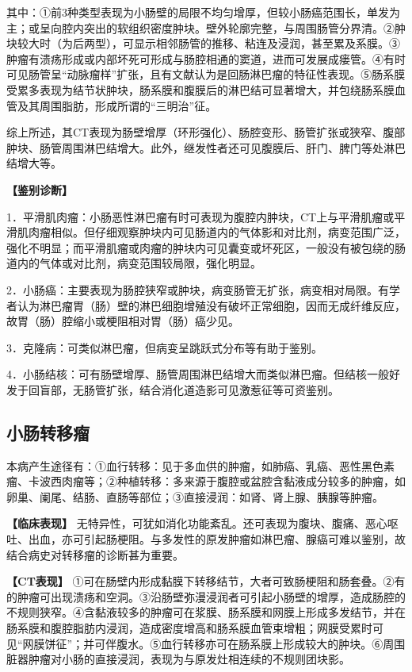 其中：①前3种类型表现为小肠壁的局限不均匀增厚，但较小肠癌范围长，单发为主；或呈向腔内突出的软组织密度肿块。壁外轮廓完整，与周围肠管分界清。②肿块较大时（为后两型），可显示相邻肠管的推移、粘连及浸润，甚至累及系膜。③肿瘤有溃疡形成或内部坏死可形成与肠腔相通的窦道，进而可发展成瘘管。④有时可见肠管呈“动脉瘤样”扩张，且有文献认为是回肠淋巴瘤的特征性表现。⑤肠系膜受累多表现为结节状肿块，肠系膜和腹膜后的淋巴结可显著增大，并包绕肠系膜血管及其周围脂肪，形成所谓的“三明治”征。

综上所述，其CT表现为肠壁增厚（环形强化）、肠腔变形、肠管扩张或狭窄、腹部肿块、肠管周围淋巴结增大。此外，继发性者还可见腹膜后、肝门、脾门等处淋巴结增大等。

\textbf{【鉴别诊断】}

1．平滑肌肉瘤：小肠恶性淋巴瘤有时可表现为腹腔内肿块，CT上与平滑肌瘤或平滑肌肉瘤相似。但仔细观察肿块内可见肠道内的气体影和对比剂，病变范围广泛，强化不明显；而平滑肌瘤或肉瘤的肿块内可见囊变或坏死区，一般没有被包绕的肠道内的气体或对比剂，病变范围较局限，强化明显。

2．小肠癌：主要表现为肠腔狭窄或肿块，病变肠管无扩张，病变相对局限。有学者认为淋巴瘤胃（肠）壁的淋巴细胞增殖没有破坏正常细胞，因而无成纤维反应，故胃（肠）腔缩小或梗阻相对胃（肠）癌少见。

3．克隆病：可类似淋巴瘤，但病变呈跳跃式分布等有助于鉴别。

4．小肠结核：可有肠壁增厚、肠管周围淋巴结增大而类似淋巴瘤。但结核一般好发于回盲部，无肠管扩张，结合消化道造影可见激惹征等可资鉴别。

\subsection{小肠转移瘤}

本病产生途径有：①血行转移：见于多血供的肿瘤，如肺癌、乳癌、恶性黑色素瘤、卡波西肉瘤等；②种植转移：多来源于腹腔或盆腔含黏液成分较多的肿瘤，如卵巢、阑尾、结肠、直肠等部位；③直接浸润：如肾、肾上腺、胰腺等肿瘤。

\textbf{【临床表现】}
无特异性，可犹如消化功能紊乱。还可表现为腹块、腹痛、恶心呕吐、出血，亦可引起肠梗阻。与多发性的原发肿瘤如淋巴瘤、腺癌可难以鉴别，故结合病史对转移瘤的诊断甚为重要。

\textbf{【CT表现】}
①可在肠壁内形成黏膜下转移结节，大者可致肠梗阻和肠套叠。②有的肿瘤可出现溃疡和空洞。③沿肠壁弥漫浸润者可引起小肠壁的增厚，造成肠腔的不规则狭窄。④含黏液较多的肿瘤可在浆膜、肠系膜和网膜上形成多发结节，并在肠系膜和腹腔脂肪内浸润，造成密度增高和肠系膜血管束增粗；网膜受累时可见“网膜饼征”；并可伴腹水。⑤血行转移亦可在肠系膜上形成较大的肿块。⑥周围脏器肿瘤对小肠的直接浸润，表现为与原发灶相连续的不规则团块影。

